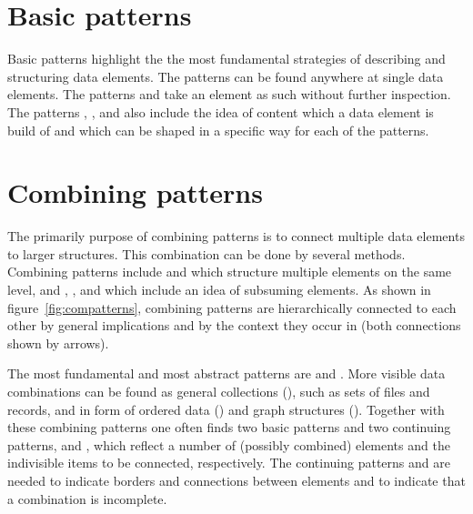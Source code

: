 \section{Basic patterns}
\label{sec:basic-patterns}

Basic patterns highlight the the most fundamental strategies of describing and
structuring data elements. The patterns can be found anywhere at single data
elements. The patterns  and  take an element
as such without further inspection. The patterns ,
, and  also include the idea of
content which a data element is build of and which can be shaped in a specific
way for each of the patterns.



\clearpage
\section{Combining patterns}
\label{sec:combining-patterns}

The primarily purpose of combining patterns is to connect multiple data
elements to larger structures. This combination can be done by several methods.
Combining patterns include  and  which
structure multiple elements on the same level, and ,
, and  which include an idea of
subsuming elements.  As shown in figure~\ref{fig:compatterns}, combining
patterns are hierarchically connected to each other by general implications and
by the context they occur in (both connections shown by arrows).

The most fundamental and most abstract patterns are  and
. More visible data combinations can be found as general
collections (), such as sets of files and records, and in
form of ordered data () and graph structures
(). Together with these combining patterns one often finds two
basic patterns and two continuing patterns,  and
, which reflect a number of (possibly combined) elements and
the indivisible items to be connected, respectively. The continuing patterns
 and  are needed to indicate borders and
connections between elements and to indicate that a combination is incomplete.


